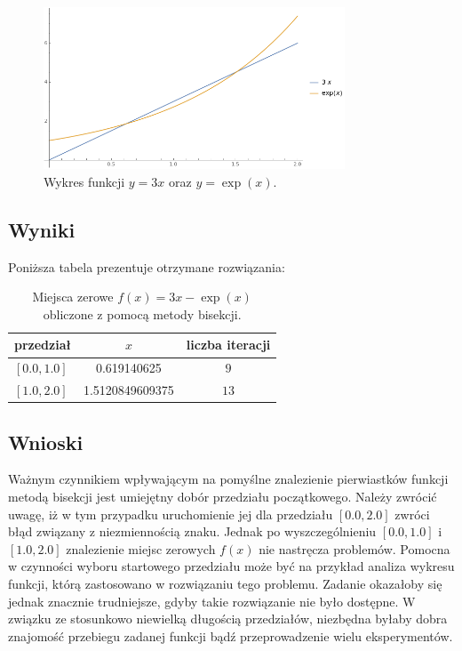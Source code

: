 \documentclass{classrep}
\begin{document}
		\begin{figure}[!htbp]
			\centering
			\includegraphics[width=0.8\textwidth]{zadania/plot51.png}
  			\caption{Wykres funkcji $y=3x$ oraz $y=\exp(x)$.}
  			\label{fig:1}
		\end{figure}	
		
	\subsection{Wyniki}
		Poniższa tabela prezentuje otrzymane rozwiązania:
		\begin{table}[!hpbt]
        		\centering
        		\footnotesize
			\begin{tabular}{lSc} \toprule
				{przedział} & {$x$} & {liczba iteracji}\\ \midrule
				$[0.0,1.0]$ & 0.619140625 & $9$ \\ 
	 			$[1.0,2.0]$ & 1.5120849609375 & $13$ \\ \bottomrule
	 		\end{tabular}
	 		\caption{Miejsca zerowe $f(x)=3x-\exp(x)$ obliczone z pomocą metody bisekcji.}
			\label{table:2}
		\end{table}	
		
	\subsection{Wnioski}
		Ważnym czynnikiem wpływającym na pomyślne znalezienie pierwiastków funkcji metodą bisekcji jest umiejętny dobór przedziału początkowego. Należy zwrócić uwagę, iż w tym przypadku uruchomienie jej dla przedziału $[0.0,2.0]$ zwróci błąd związany z niezmiennością znaku. Jednak po wyszczególnieniu $[0.0,1.0]$ i $[1.0,2.0]$ znalezienie miejsc zerowych $f(x)$ nie nastręcza problemów. Pomocna w czynności wyboru startowego przedziału może być na przykład analiza wykresu funkcji, którą zastosowano w rozwiązaniu tego problemu. Zadanie okazałoby się jednak znacznie trudniejsze, gdyby takie rozwiązanie nie było dostępne. W związku ze stosunkowo niewielką długością przedziałów, niezbędna byłaby dobra znajomość przebiegu zadanej funkcji bądź przeprowadzenie wielu eksperymentów. 
		
\end{document}
